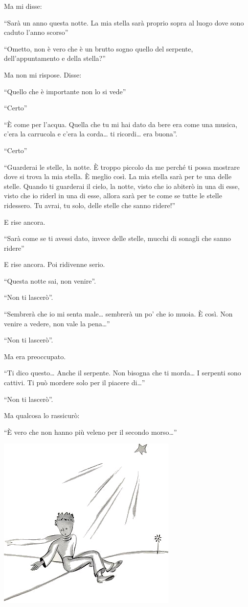 \documentclass[11pt]{scrbook}
\begin{document}
Ma mi disse:

``Sarà un anno questa notte. La mia stella sarà proprio sopra al luogo dove sono caduto l'anno scorso''

``Ometto, non è vero che è un brutto sogno quello del serpente, dell'appuntamento e della stella?''

Ma non mi rispose. Disse:

``Quello che è importante non lo si vede''

``Certo''

``È come per l'acqua. Quella che tu mi hai dato da bere era come una musica, c'era la carrucola e c'era la corda\ldots{} ti ricordi\ldots{} era buona''.

``Certo''

``Guarderai le stelle, la notte. È troppo piccolo da me perché ti possa mostrare dove si trova la mia stella. È meglio così. La mia stella sarà per te una delle stelle. Quando ti guarderai il cielo, la notte, visto che io abiterò in una di esse, visto che io riderl in una di esse, allora sarà per te come se tutte le stelle ridessero. Tu avrai, tu solo, delle stelle che sanno ridere!''

E rise ancora.

``Sarà come se ti avessi dato, invece delle stelle, mucchi di sonagli che sanno ridere''

E rise ancora. Poi ridivenne serio.

``Questa notte sai, non venire''.

``Non ti lascerò''.

``Sembrerà che io mi senta male\ldots{} sembrerà un po' che io muoia. È così. Non venire a vedere, non vale la pena\ldots{}''

``Non ti lascerò''.

Ma era preoccupato.

``Ti dico questo\ldots{} Anche il serpente. Non bisogna che ti morda\ldots{} I serpenti sono cattivi. Ti può mordere solo per il piacere di\ldots{}''

``Non ti lascerò''.

Ma qualcosa lo rassicurò:

``È vero che non hanno più veleno per il secondo morso\ldots{}''

\begin{center}
\includegraphics{img/26b}
\end{center}
\end{document}
